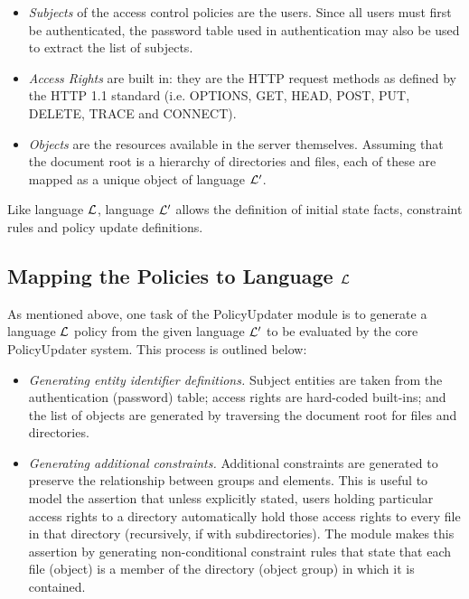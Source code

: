 \documentclass[global,twocolumn,final]{svjour}
\begin{document}
      \begin{itemize}
        \item
          {\em Subjects} of the access control policies are the users. Since
          all users must first be authenticated, the password table used
          in authentication may also be used to extract the list of subjects.
        \item
          {\em Access Rights} are built in: they are the HTTP request methods
          as defined by the HTTP 1.1 standard \cite{HTTP1} (i.e. OPTIONS, GET,
          HEAD, POST, PUT, DELETE, TRACE and CONNECT).
        \item
          {\em Objects} are the resources available in the server themselves.
          Assuming that the document root is a hierarchy of directories and
          files, each of these are mapped as a unique object of language
          ${\cal L'}$.
      \end{itemize}

      Like language ${\cal L}$, language ${\cal L'}$ allows the definition of
      initial state facts, constraint rules and policy update definitions.

    \subsection{Mapping the Policies to Language ${\cal L}$}

      As mentioned above, one task of the PolicyUpdater module is to generate
      a language ${\cal L}$ policy from the given language ${\cal L'}$ to be
      evaluated by the core PolicyUpdater system. This process is outlined
      below:

      \begin{itemize}
        \item
          {\em Generating entity identifier definitions.} Subject entities are
          taken from the authentication (password) table; access rights are
          hard-coded built-ins; and the list of objects are generated by
          traversing the document root for files and directories.
        \item
          {\em Generating additional constraints.} Additional constraints are
          generated to preserve the relationship between groups and elements.
          This is useful to model the assertion that unless explicitly stated,
          users holding particular access rights to a directory automatically
          hold those access rights to every file in that directory
          (recursively, if with subdirectories). The module makes this
          assertion by generating non-conditional constraint rules that state
          that each file (object) is a member of the directory (object group)
          in which it is contained.
      \end{itemize}
\end{document}
